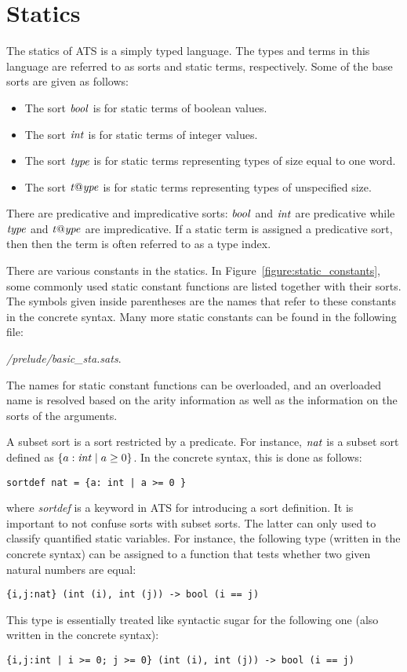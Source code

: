 \section{Statics}
The statics of ATS is a simply typed language. The types and terms in this
language are referred to as sorts and static terms, respectively. Some of
the base sorts are given as follows:
\begin{itemize}
\item The sort ${\it bool}$ is for static terms of boolean values.
\item The sort ${\it int}$ is for static terms of integer values.
\item The sort ${\it type}$ is for static terms representing types of size
equal to one word.
\item The sort ${\it t@ype}$ is for static terms representing types of
unspecified size.
\end{itemize}
There are predicative and impredicative sorts:
${\it bool}$ and ${\it int}$ are predicative while ${\it type}$ and ${\it t@ype}$ are
impredicative. If a static term is assigned a predicative sort, then
then the term is often referred to as a type index.

There are various constants in the statics.  In
Figure~\ref{figure:static_constants}, some commonly used static constant
functions are listed together with their sorts.  The symbols given inside
parentheses are the names that refer to these constants in the concrete
syntax. Many more static constants can be found in the following file:
\begin{center}
{\it\ATSHOME/prelude/basic\_sta.sats}.
\end{center}
The names for static constant functions can be overloaded, and an
overloaded name is resolved based on the arity information as well as the
information on the sorts of the arguments.

A subset sort is a sort restricted by a predicate. For instance, ${\it nat}$ is
a subset sort defined as $\{a:{\it int}\mid a\geq 0\}$. In the concrete syntax,
this is done as follows:
\begin{verbatim}
sortdef nat = {a: int | a >= 0 }
\end{verbatim}
where {\it sortdef} is a keyword in ATS for introducing a sort definition.
It is important to not confuse sorts with subset sorts. The latter can only
used to classify quantified static variables.  For instance, the following
type (written in the concrete syntax) can be assigned to a function that
tests whether two given natural numbers are equal:
\begin{verbatim}
{i,j:nat} (int (i), int (j)) -> bool (i == j)
\end{verbatim}
This type is essentially treated like syntactic sugar for the following
one (also written in the concrete syntax):
\begin{verbatim}
{i,j:int | i >= 0; j >= 0} (int (i), int (j)) -> bool (i == j)
\end{verbatim}

